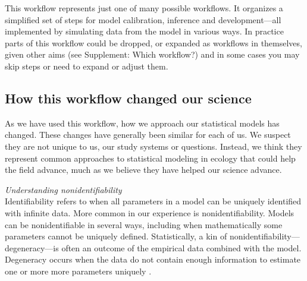 \documentclass[11pt]{article}
\begin{document}
{This workflow represents just one of many possible workflows. It organizes a simplified set of steps for model calibration, inference and development---all implemented by simulating data from the model in various ways. In practice parts of this workflow could be dropped, or expanded as workflows in themselves, given other aims (see Supplement: Which workflow?) and in some cases you may skip steps or need to expand or adjust them. 

\subsection*{How this workflow changed our science} %

As we have used this workflow, how we approach our statistical models has changed. These changes have generally been similar for each of us. We suspect they are not unique to us, our study systems or questions. Instead, we think they represent common approaches to statistical modeling in ecology that could help the field advance, much as we believe they have helped our science advance. 

 \emph{Understanding nonidentifiability} \\
Identifiability refers to when all parameters in a model can be uniquely identified with infinite data. More common in our experience is nonidentifiability. Models can be nonidentifiable in several ways, including when mathematically some parameters cannot be uniquely defined. Statistically, a kin of nonidentifiability---degeneracy---is often an outcome of the empirical data combined with the model. Degeneracy occurs when the data do not contain enough information to estimate one or more more parameters uniquely \citep{gelmanhill}. 

}
\end{document}
